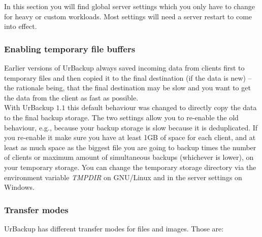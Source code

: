 \documentclass[a4paper,10pt]{article}
\begin{document}
In this section you will find global server settings which you only have to
change for heavy or custom workloads. Most settings will need a server restart
to come into effect.

\subsubsection{Enabling temporary file buffers}
\label{temp_file_buffers}

Earlier versions of UrBackup always saved incoming data from clients first to temporary
files and then copied it to the final destination (if the data is new) -- the rationale
being, that the final destination may be slow and you want to get the data from the client
as fast as possible.\\
With UrBackup $1.1$ this default behaviour was changed to directly copy the data to the
final backup storage. The two settings allow you to re-enable the old behaviour, e.g.,
because your backup storage is slow because it is deduplicated. If you re-enable it
make sure you have at least 1GB of space for each client, and at least as much space as
the biggest file you are going to backup times the number of clients or maximum amount of simultaneous backups (whichever is lower), on your temporary storage. You can change the temporary storage directory via the environment variable \textsl{TMPDIR} on GNU/Linux and in the server settings on Windows.

\subsubsection{Transfer modes}

UrBackup has different transfer modes for files and images. Those are:
\end{document}
